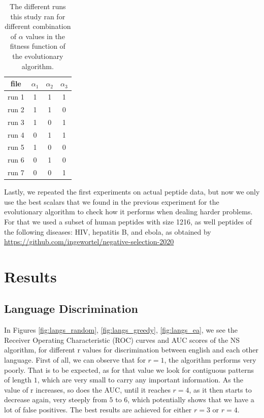 \documentclass{article}
\begin{document}
\begin{table}[h]
    \centering
    \begin{tabular}{|c|c|c|c|}
        \hline
        \textbf{file} & \textbf{$\alpha_1$} & \textbf{$\alpha_2$} & \textbf{$\alpha_3$} \\
        \hline
        run 1 & 1 & 1 & 1 \\ 
        run 2 & 1 & 1 & 0 \\
        run 3 & 1 & 0 & 1  \\
        run 4 & 0 & 1 & 1  \\
        run 5 & 1 & 0 & 0  \\ 
        run 6 & 0 & 1 & 0  \\
        run 7 & 0 & 0 & 1  \\
        \hline
    \end{tabular}
    \caption{The different runs this study ran for different combination of $\alpha$ values in the fitness function of the evolutionary algorithm.}
    \label{tab:files}
\end{table}


Lastly, we repeated the first experiments on actual peptide data, but now we only use the best scalars that we found in the previous experiment for the evolutionary algorithm to check how it performs when dealing harder problems.
For that we used a subset of human peptides with 
size 1216, as well peptides of the following diseases: HIV, hepatitis B, and ebola, as obtained by \url{https://github.com/ingewortel/negative-selection-2020}

\section{Results}
\subsection{Language Discrimination}
In Figures \ref{fig:langs_random}, \ref{fig:langs_greedy}, \ref{fig:langs_ea}, we see the Receiver Operating 
Characteristic (ROC) curves and AUC scores of the NS algorithm, for different r values for discrimination between
english and each other language. First of all, we can observe that for $r=1$, the algorithm performs very poorly. That 
is to be expected, as for that value we look for contiguous patterns of length $1$, which are very small to carry any 
important information. As the value of r increases, so does the AUC, until it reaches $r=4$, as it then starts to 
decrease again, very steeply from $5$ to $6$, which potentially shows that we have a lot of false positives. The best 
results are achieved for either $r=3$ or $r=4$.
\end{document}
